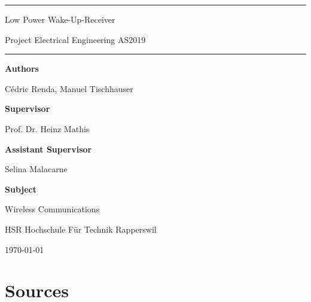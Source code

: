 \documentclass[a4paper,12pt]{book}
\begin{document}
\pagestyle{fancy}
\lhead{}
\rhead{}
\frontmatter
\newcommand\HRule{\noindent\rule{\linewidth}{1.5pt}}



\hypersetup{
	colorlinks=true,
	linktoc=all,
	linkcolor=blue
}


\newtheorem{satz}{Theorem}[chapter]
\newtheorem{problem}[satz]{Problem}
\newtheorem{hilfssatz}[satz]{Lemma}
\newtheorem{definition}[satz]{Definition}
\newtheorem{annahme}[satz]{Assumption}
\newtheorem{aufgabe}[satz]{Task}
\newenvironment{beispiel}[1][Example]{%
	\begin{proof}[#1]%
		\renewcommand{\qedsymbol}{$\bigcirc$}
	}{\end{proof}}


\begin{titlepage}
\HRule
\vspace*{10pt}
\begin{flushright}
{\Huge
Low Power Wake-Up-Receiver}

\end{flushright}
\begin{flushright}
{\Large Project Electrical Engineering AS2019}
\end{flushright}
\HRule

\vspace{70pt}
\large
\textbf{Authors}

Cédric Renda, Manuel Tischhauser

\textbf{Supervisor}

Prof. Dr. Heinz Mathis

\textbf{Assistant Supervisor}

Selina Malacarne

\textbf{Subject}

Wireless Communications



\begin{center}
HSR Hochschule Für Technik Rapperswil

\today
\end{center}
\end{titlepage}



\tableofcontents




\mainmatter










\chapter*{Sources}
\printbibliography[heading=none]

\appendix


\vfill
\pagebreak
\ifodd\value{page}\else\null\clearpage\fi
{}
\rhead{}

\end{document}
